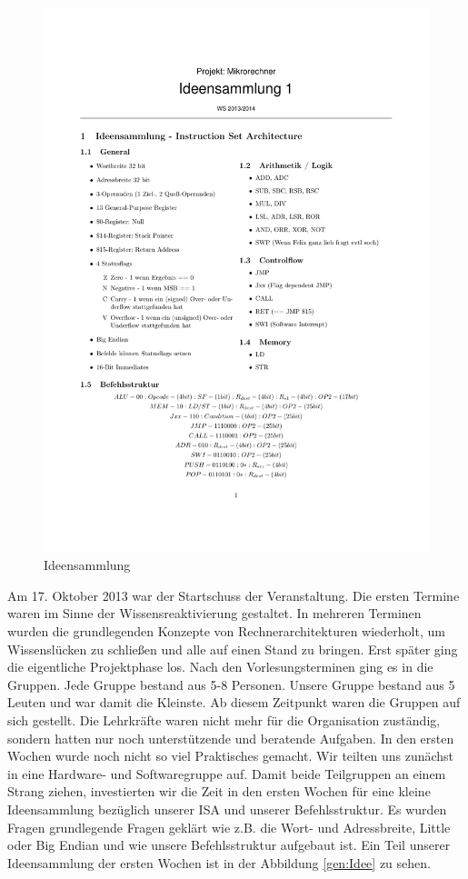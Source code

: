 \begin{figure}
\vspace{-4.5em}
\includegraphics[width=.5\textwidth]{images/Ideensammlung.pdf}
\vspace{-4.5em}
\caption{\label{gen:Idee} Ideensammlung}
\end{figure}
Am 17. Oktober 2013 war der Startschuss der Veranstaltung. Die ersten Termine waren im Sinne der Wissensreaktivierung gestaltet. In mehreren Terminen wurden die grundlegenden Konzepte 
von Rechnerarchitekturen wiederholt, um Wissenslücken zu schließen und alle auf einen Stand zu bringen. Erst später ging die eigentliche Projektphase los.
Nach den Vorlesungsterminen ging es in die Gruppen. Jede Gruppe bestand aus 5-8 Personen. Unsere Gruppe bestand aus 5 Leuten und war damit die Kleinste. Ab diesem Zeitpunkt waren die Gruppen auf sich gestellt. Die Lehrkräfte waren nicht mehr für die Organisation zuständig, sondern hatten nur noch unterstützende und beratende Aufgaben.
In den ersten Wochen wurde noch nicht so viel Praktisches gemacht. Wir teilten uns zunächst in eine Hardware- und Softwaregruppe auf. Damit beide Teilgruppen an einem Strang ziehen, investierten wir die Zeit in den ersten Wochen für eine kleine Ideensammlung bezüglich unserer ISA und unserer Befehlsstruktur. 
Es wurden Fragen grundlegende Fragen geklärt wie z.B. die Wort- und Adressbreite, Little oder Big Endian und wie unsere Befehlsstruktur aufgebaut ist. Ein Teil unserer Ideensammlung der ersten Wochen ist in der Abbildung \autoref{gen:Idee} zu sehen.

